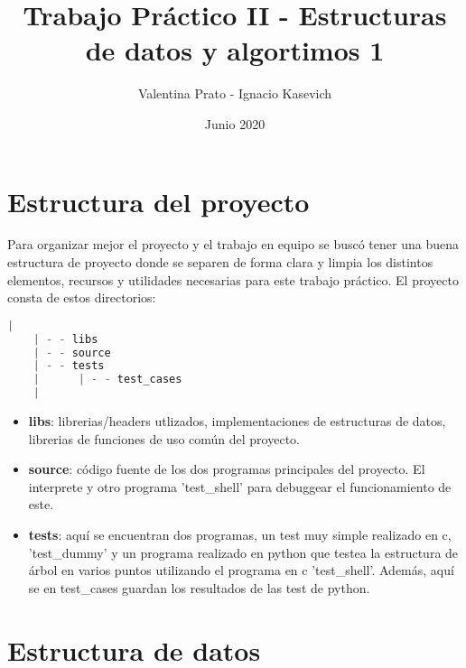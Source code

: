 \documentclass[a4paper, 12pt]{article}
\title{Trabajo Práctico II - Estructuras de datos y algortimos 1}
\author{Valentina Prato - Ignacio Kasevich }
\date{Junio 2020}
\begin{document}
\maketitle
\section{Estructura del proyecto}
	Para organizar mejor el proyecto y el trabajo en equipo se buscó tener una buena estructura de proyecto donde se separen de forma clara y limpia los distintos elementos, recursos y utilidades necesarias para este trabajo práctico. El proyecto consta de estos directorios:
	\begin{lstlisting}[language=C]
    |
    | - - libs
    | - - source               
    | - - tests
    |      | - - test_cases
    |
    \end{lstlisting}
    
\begin{itemize}
\item \textbf{libs}: librerias/headers utlizados, implementaciones de estructuras de datos, librerias de funciones de uso común del proyecto.
\item \textbf{source}: código fuente de los dos programas principales del proyecto. El interprete y otro programa 'test\_shell' para debuggear el funcionamiento de este.
\item  \textbf{tests}: aquí se encuentran dos programas, un test muy simple realizado en c, 'test\_dummy' y un programa realizado en python que testea la estructura de árbol en varios puntos utilizando el programa en c 'test\_shell'. Además, aquí se en test\_cases guardan los resultados de las test de python.
\end{itemize}

\section{Estructura de datos}
\end{document}
